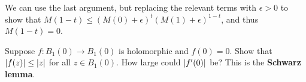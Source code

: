\documentclass{homework}
\begin{document}
\begin{solution}
\begin{enumerate}
                                                                                                                                                                                                                                                              We can use the last argument, but replacing the relevant terms with $\epsilon>0$ to show that $M(1-t) \leq (M(0)+\epsilon)^t (M(1)+\epsilon)^{1-t}$, and thus $M(1-t) = 0$.
                                                                                                                                                                                                                                                              \end{enumerate}

                                                                                                                                                                                                                                                              \end{solution}
                                                                                                                                                                                                                                                              \begin{problem}\label{schwarz-lemma}Suppose $f : B_1(0) \to B_1(0)$ is holomorphic and $f(0) = 0$.  Show
                                                                                                                                                                                                                                                                that $\left|f(z)\right| \leq \left|z\right|$ for all $z \in B_1(0)$.  How large
                                                                                                                                                                                                                                                                  could $\left|f'(0)\right|$ be?  This is the \textbf{Schwarz lemma}.
                                                                                                                                                                                                                                                                  \end{problem}
\end{document}
